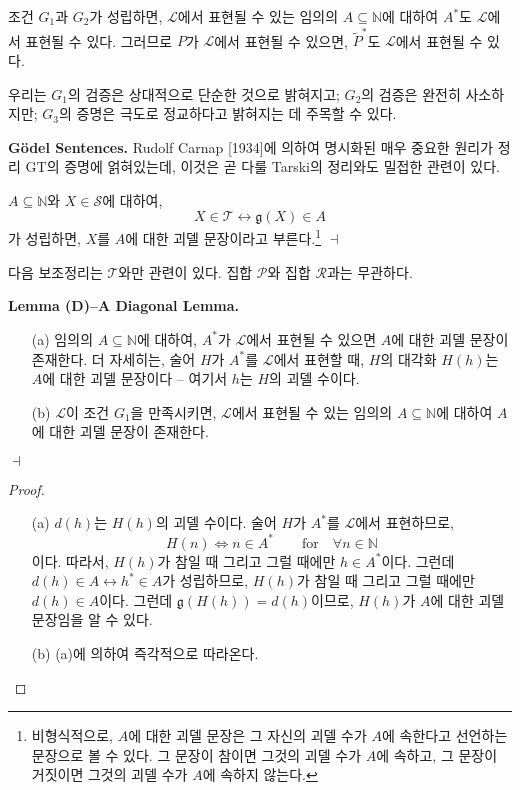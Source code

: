 \documentclass[12pt]{paper}
\newcommand{\gnum}
{ \mathfrak{g} }
\newenvironment{context}[1][]
{ \noindent \textbf{{#1}.} }
{ \hfill $ \dashv $ }
\begin{document}
조건 $G_{1}$과 $G_{2}$가 성립하면,
$\mathcal{L}$에서 표현될 수 있는 임의의 $A \subseteq \mathbb{N}$에 대하여 $A^{*}$도 $\mathcal{L}$에서 표현될 수 있다.
그러므로 $P$가 $\mathcal{L}$에서 표현될 수 있으면,
$\widetilde{P}^{*}$도 $\mathcal{L}$에서 표현될 수 있다.

우리는 $G_{1}$의 검증은 상대적으로 단순한 것으로 밝혀지고; $G_{2}$의 검증은 완전히 사소하지만; $G_{3}$의 증명은 극도로 정교하다고 밝혀지는 데 주목할 수 있다.

\begin{context}[G\"odel Sentences]
Rudolf Carnap [1934]에 의하여 명시화된 매우 중요한 원리가 정리 GT의 증명에 얽혀있는데,
이것은 곧 다룰 Tarski의 정리와도 밀접한 관련이 있다.

$A \subseteq \mathbb{N}$와 $X \in \mathcal{S}$에 대하여,
$$X \in \mathcal{T} \leftrightarrow \gnum \left( X \right) \in A$$가 성립하면,
$X$를 $A$에 대한 괴델 문장이라고 부른다.\footnote
{
비형식적으로, $A$에 대한 괴델 문장은 그 자신의 괴델 수가 $A$에 속한다고 선언하는 문장으로 볼 수 있다.
그 문장이 참이면 그것의 괴델 수가 $A$에 속하고, 그 문장이 거짓이면 그것의 괴델 수가 $A$에 속하지 않는다.
}
\end{context}

다음 보조정리는 $\mathcal{T}$와만 관련이 있다.
집합 $\mathcal{P}$와 집합 $\mathcal{R}$과는 무관하다.

\begin{context}[Lemma (D)--A Diagonal Lemma]
\begin{itemize}
\item[(a)] 임의의 $A \subseteq \mathbb{N}$에 대하여, $A^{*}$가 $\mathcal{L}$에서 표현될 수 있으면 $A$에 대한 괴델 문장이 존재한다.
더 자세히는, 술어 $H$가 $A^{*}$를 $\mathcal{L}$에서 표현할 때, $H$의 대각화 $H \left( h \right)$는 $A$에 대한 괴델 문장이다 --
여기서 $h$는 $H$의 괴델 수이다.
\item[(b)] $\mathcal{L}$이 조건 $G_{1}$을 만족시키면, $\mathcal{L}$에서 표현될 수 있는 임의의 $A \subseteq \mathbb{N}$에 대하여 $A$에 대한 괴델 문장이 존재한다.
\end{itemize}
\end{context}

\begin{proof}
\begin{itemize}
\item[(a)] $d \left( h \right)$는 $H \left( h \right)$의 괴델 수이다.
술어 $H$가 $A^{*}$를 $\mathcal{L}$에서 표현하므로,
$$ H \left( n \right) \iff n \in A^{*} \qquad \mathrm{for} \quad \forall n \in \mathbb{N} $$이다.
따라서, $H \left( h \right)$가 참일 때 그리고 그럴 때에만 $h \in A^{*}$이다.
그런데 $d \left( h \right) \in A \leftrightarrow h^{*} \in A$가 성립하므로,
$H \left( h \right)$가 참일 때 그리고 그럴 때에만 $d \left( h \right) \in A$이다.
그런데 $\gnum \left( H \left( h \right) \right) = d \left( h \right)$이므로,
$H \left( h \right)$가 $A$에 대한 괴델 문장임을 알 수 있다.

\item[(b)] (a)에 의하여 즉각적으로 따라온다.
\end{itemize}
\end{proof}
\end{document}
